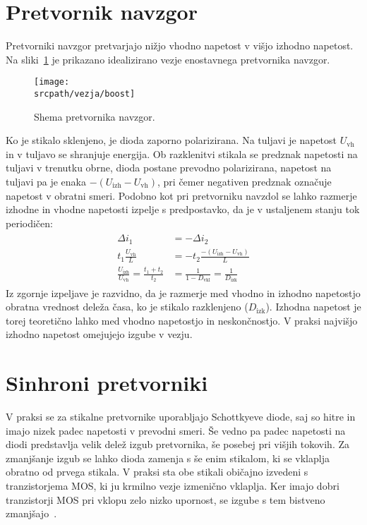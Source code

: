 \documentclass[a4paper,twoside,openright,12pt,slovene]{book}
\newcommand{\srcpath}{res_dark}
\newcommand{\srcpath}{res}
\begin{document}
\section{Pretvornik navzgor} \label{sec:pretvornik_navzgor}
Pretvorniki navzgor pretvarjajo nižjo vhodno napetost v višjo izhodno napetost.
Na sliki~\ref{fig:pretvornik_navzgor} je prikazano idealizirano vezje enostavnega pretvornika navzgor.
\begin{figure}[H]
    \centering
    \texttt{[image: \\srcpath/vezja/boost]}
    \caption{\label{fig:pretvornik_navzgor} Shema pretvornika navzgor.}
\end{figure}

Ko je stikalo sklenjeno, je dioda zaporno polarizirana.
Na tuljavi je napetost $U_\mathrm{vh}$ in v tuljavo se shranjuje energija.
Ob razklenitvi stikala se predznak napetosti na tuljavi v trenutku obrne, dioda postane prevodno polarizirana,
napetost na tuljavi pa je enaka $-(U_\mathrm{izh}-U_\mathrm{vh})$, pri čemer negativen predznak označuje napetost v obratni smeri.
Podobno kot pri pretvorniku navzdol se lahko razmerje izhodne in vhodne napetosti izpelje s predpostavko, da je v ustaljenem stanju tok periodičen:
\begin{align}
\begin{split}
    \Delta i_1 & = -\Delta i_2 \\
    t_1 \frac{U_\mathrm{vh}}{L} & = -t_2 \frac{-(U_\mathrm{izh}-U_\mathrm{vh})}{L} \\
    \frac{U_\mathrm{izh}}{U_\mathrm{vh}} = \frac{t_1 + t_2}{t_2} & = \frac{1}{1-D_\mathrm{vkl}}=\frac{1}{D_\mathrm{izk}}
    \label{izp:izpeljava-pretvornik-navzgor}
\end{split}
\end{align}
Iz zgornje izpeljave je razvidno, da je razmerje med vhodno in izhodno napetostjo obratna vrednost deleža časa, ko je stikalo razklenjeno ($D_\mathrm{izk}$).
Izhodna napetost je torej teoretično lahko med vhodno napetostjo in neskončnostjo.
V praksi najvišjo izhodno napetost omejujejo izgube v vezju.

\section{Sinhroni pretvorniki}\label{sec:sinhroni_pretvorniki}

V praksi se za stikalne pretvornike uporabljajo Schottkyeve diode, saj so hitre in imajo nizek padec napetosti v prevodni smeri.
Še vedno pa padec napetosti na diodi predstavlja velik delež izgub pretvornika, še posebej pri višjih tokovih.
Za zmanjšanje izgub se lahko dioda zamenja s še enim stikalom, ki se vklaplja obratno od prvega stikala.
V praksi sta obe stikali običajno izvedeni s tranzistorjema MOS, ki ju krmilno vezje izmenično vklaplja.
Ker imajo dobri tranzistorji MOS pri vklopu zelo nizko upornost, se izgube s tem bistveno zmanjšajo~\cite{mack_chapter_2008}.
\end{document}
